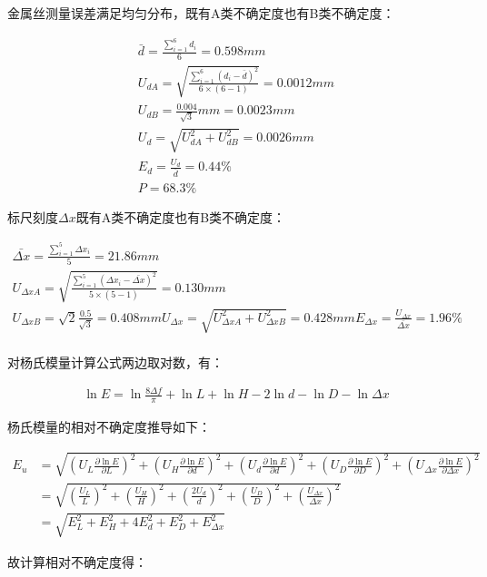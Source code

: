 \documentclass[signature=data]{physicsreport}
\begin{document}
金属丝测量误差满足均匀分布，既有A类不确定度也有B类不确定度：

\begin{gather*}
    \bar d = \frac{\sum_{i=1}^{6}d_i}{6} = 0.598mm\\
    U_{dA} = \sqrt{ \frac{\sum_{i=1}^{6}(d_i - \bar d)^2}{6 \times (6-1)} } = 0.0012mm\\
    U_{dB} = \frac{0.004}{\sqrt 3}mm = 0.0023mm\\
    U_d = \sqrt{U_{dA}^2 + U_{dB}^2} = 0.0026mm\\
    E_d = \frac{U_d}{\bar d} = 0.44\%\\
    P = 68.3\%
\end{gather*}

标尺刻度$\Delta x$既有A类不确定度也有B类不确定度：

\begin{gather*}
    \bar{\Delta x} = \frac{\sum_{i=1}^{5}\Delta x_i}{5} = 21.86mm\\
    U_{\Delta x A} = \sqrt{ \frac{\sum_{i=1}^{5}(\Delta x_i - \bar{\Delta x})^2}{5 \times (5-1)} } = 0.130mm\\
    U_{\Delta x B} = \sqrt{2} \frac{0.5}{\sqrt 3} = 0.408mm
    U_{\Delta x} = \sqrt{ U_{\Delta x A}^2 + U_{\Delta x B}^2 } = 0.428mm
    E_{\Delta x} = \frac{U_{\Delta x}}{\bar{\Delta x}} = 1.96\%\\
\end{gather*}

对杨氏模量计算公式两边取对数，有：

\begin{gather*}
    \ln E = \ln \frac{8 \Delta f}{\pi} + \ln L + \ln H - 2 \ln d - \ln D - \ln \Delta x
\end{gather*}

杨氏模量的相对不确定度推导如下：

\begin{align*}
    E_u &= \sqrt{(U_L \frac{\partial \ln E}{\partial L})^2 + (U_H \frac{\partial \ln E}{\partial d})^2 + (U_d \frac{\partial \ln E}{\partial d})^2 + (U_D \frac{\partial \ln E}{\partial D})^2 + (U_{\Delta x} \frac{\partial \ln E }{\partial \Delta x})^2} \\
        &= \sqrt{ (\frac{U_L}{L})^2 + (\frac{U_H}{H})^2 + (\frac{2U_d}{d})^2 + (\frac{U_D}{D})^2 + (\frac{U_{\Delta x}}{\Delta x})^2 } \\
        &= \sqrt{ E_L^2 + E_H^2 + 4E_d^2 + E_D^2 + E_{\Delta x}^2 } \
\end{align*}

故计算相对不确定度得：
\end{document}
